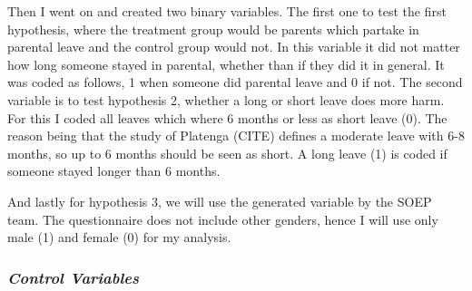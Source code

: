 \documentclass[
  12pt,
]{article}
\begin{document}
Then I went on and created two binary variables. The first one to test the first hypothesis, where the treatment group would be parents which partake in parental leave and the control group would not. In this variable it did not matter how long someone stayed in parental, whether than if they did it in general. It was coded as follows, 1 when someone did parental leave and 0 if not.
The second variable is to test hypothesis 2, whether a long or short leave does more harm. For this I coded all leaves which where 6 months or less as short leave (0). The reason being that the study of Platenga (CITE) defines a moderate leave with 6-8 months, so up to 6 months should be seen as short. A long leave (1) is coded if someone stayed longer than 6 months.

And lastly for hypothesis 3, we will use the generated variable by the SOEP team. The questionnaire does not include other genders, hence I will use only male (1) and female (0) for my analysis.

\hypertarget{control-variables}{%
\subsubsection*{\texorpdfstring{\emph{Control Variables}}{Control Variables}}\label{control-variables}}
\end{document}
